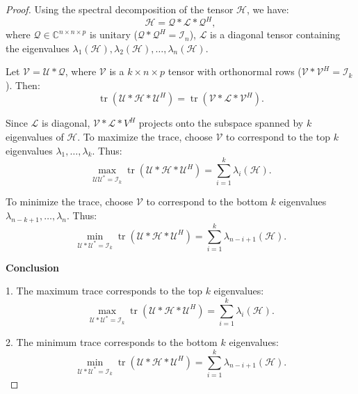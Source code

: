 \documentclass[oupthm]{CUP-JNL-BCM}%
\theoremstyle{oupplain}
\theoremstyle{oupdefinition}
\theoremstyle{oupremark}
\theoremstyle{oupproof}
\newtheorem{proof}{Proof}
\numberwithin{equation}{section}
\begin{document}
\begin{proof}
    
Using the spectral decomposition of the tensor $\mathcal{H}$, we have:
\begin{equation*}
    \mathcal{H} = \mathcal{Q} * \mathcal{L} * \mathcal{Q}^H,
\end{equation*}
where $\mathcal{Q} \in \mathbb{C}^{n \times n \times p}$ is unitary ($\mathcal{Q} * \mathcal{Q}^H = \mathcal{I}_n$), $\mathcal{L}$ is a diagonal tensor containing the eigenvalues $\lambda_1(\mathcal{H}), \lambda_2(\mathcal{H}), \dots, \lambda_n(\mathcal{H})$.


\noindent Let $\mathcal{V} = \mathcal{U} * \mathcal{Q}$, where $\mathcal{V}$ is a $k \times n \times p$ tensor with orthonormal rows ($\mathcal{V} * \mathcal{V}^H = \mathcal{I}_k$). Then:
\begin{equation*}
    \operatorname{tr}(\mathcal{U} * \mathcal{H} * \mathcal{U}^H) = \operatorname{tr}(\mathcal{V} * \mathcal{L} * \mathcal{V}^H).
\end{equation*}


Since $\mathcal{L}$ is diagonal, $\mathcal{V} * \mathcal{L} * V^H$ projects onto the subspace spanned by $k$ eigenvalues of $\mathcal{H}$. To maximize the trace, choose $\mathcal{V}$ to correspond to the top $k$ eigenvalues $\lambda_1, \dots, \lambda_k$. Thus:
\begin{equation*}
    \max_{\mathcal{U}\mathcal{U}^* = \mathcal{I}_k} \operatorname{tr}(\mathcal{U} * \mathcal{H} * \mathcal{U}^H) = \sum_{i=1}^k \lambda_i(\mathcal{H}).
\end{equation*}


To minimize the trace, choose $\mathcal{V}$ to correspond to the bottom $k$ eigenvalues $\lambda_{n-k+1}, \dots, \lambda_n$. Thus:
\begin{equation*}
    \min_{\mathcal{U}*\mathcal{U}^* = \mathcal{I}_k} \operatorname{tr}(\mathcal{U} * \mathcal{H} * \mathcal{U}^H) = \sum_{i=1}^k \lambda_{n-i+1}(\mathcal{H}).
\end{equation*}

\textbf{Conclusion}

1. The maximum trace corresponds to the top $k$ eigenvalues:
\begin{equation*}
    \max_{\mathcal{U}*\mathcal{U}^* = \mathcal{I}_k} \operatorname{tr}(\mathcal{U} * \mathcal{H} * \mathcal{U}^H) = \sum_{i=1}^k \lambda_i(\mathcal{H}).
\end{equation*}

2. The minimum trace corresponds to the bottom $k$ eigenvalues:
\begin{equation*}
    \min_{\mathcal{U}*\mathcal{U}^* = \mathcal{I}_k} \operatorname{tr}(\mathcal{U} * \mathcal{H} * \mathcal{U}^H) = \sum_{i=1}^k \lambda_{n-i+1}(\mathcal{H}).
\end{equation*}

\end{proof}
\end{document}
